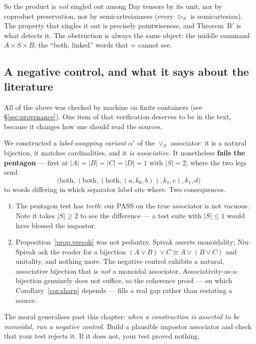 So the product is \emph{not} singled out among Day tensors by its unit, nor by
coproduct preservation, nor by semicartesianness (every $\rhd_S$ is
semicartesian). The property that singles it out is precisely pointwiseness, and
Theorem~B$'$ is what detects it. The obstruction is always the same object: the
middle summand $A\times S\times B$, the ``both, linked'' words that $+$ cannot
see.

\subsection{A negative control, and what it says about the literature}
\label{sec:negcontrol}

All of the above was checked by machine on finite containers (see
§\ref{sec:provenance}). One item of that verification deserves to be in the text,
because it changes how one should read the sources.

We constructed a \emph{label-swapping variant} $\alpha'$ of the $\vee_S$
associator: it is a natural bijection, it matches cardinalities, and it \emph{is
associative}. It nonetheless \textbf{fails the pentagon} --- first at
$|A|=|B|=|C|=|D|=1$ with $|S|=2$, where the two legs send
\[
 \bigl(\text{both}, (\text{both},(\text{both},(a,k_0,b)),k_1,c),k_1,d\bigr)
\]
to words differing in which separator label sits where. Two consequences.

\begin{enumerate}
\item The pentagon test has \emph{teeth}: our PASS on the true associator is not
  vacuous. Note it takes $|S|\ge 2$ to see the difference --- a test suite with
  $|S|\le1$ would have blessed the impostor.
\item Proposition~\ref{prop:veecoh} was not pedantry. Spivak
  \cite[eq.~(9)]{SpivakRef} asserts monoidality; Niu--Spivak
  \cite[Ex.~3.82]{NiuSpivak} ask the reader for a bijection
  $(A\vee B)\vee C\cong A\vee(B\vee C)$ and unitality, and nothing more. The
  negative control exhibits a natural, associative bijection that is \emph{not} a
  monoidal associator. Associativity-as-a-bijection genuinely does not suffice,
  so the coherence proof --- on which Corollary~\ref{cor:sharp} depends --- fills a
  real gap rather than restating a source.
\end{enumerate}

The moral generalises past this chapter: \emph{when a construction is asserted
to be monoidal, run a negative control.} Build a plausible impostor associator
and check that your test rejects it. If it does not, your test proved nothing.

